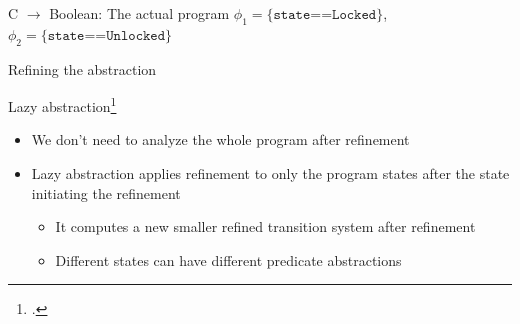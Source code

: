 \documentclass[aspectratio=169]{beamer}
\begin{document}
\begin{frame}{C $\to$ Boolean: The actual program}
  \small
  $\phi_1 = \texttt{\{state==Locked\}}$, $\phi_2 = \texttt{\{state==Unlocked\}}$\\
%       
%       
\end{frame}

\begin{frame}{Refining the abstraction}
\end{frame}

\begin{frame}{Lazy abstraction\footcite{henzinger2002lazy}}
  \begin{itemize}[<+->]
  \item We don't need to analyze the whole program after refinement
  \item Lazy abstraction applies refinement to only the program states after the state initiating the refinement
    \begin{itemize}
    \item It computes a new smaller refined transition system after refinement
    \item Different states can have different predicate abstractions
    \end{itemize}
  \end{itemize}
\end{frame}
\end{document}
